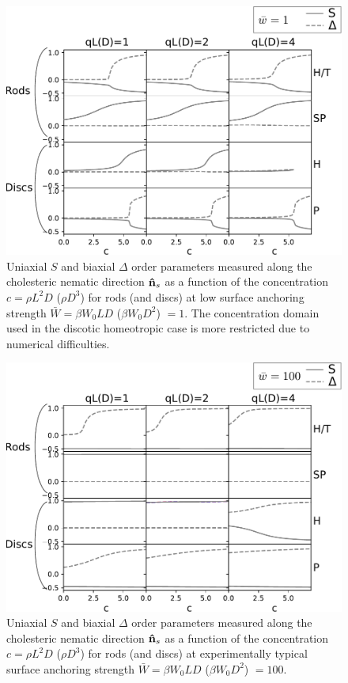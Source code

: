    \begin{figure}
	\includegraphics[width = \columnwidth]{figures/chapter-4/w1order}
	\caption{ Uniaxial $S$ and biaxial $\Delta$ order parameters measured along the cholesteric nematic direction ${\bf \hat{n}}_{s}$ as a function of the concentration $c = \rho L^{2}D$ ($\rho D^{3}$) for rods (and discs) at low surface anchoring strength $\bar{W} = \beta W_{0}LD$ ($\beta W_{0}D^2$) $= 1$. The concentration domain used in the discotic homeotropic case is more restricted due to  numerical difficulties.}
	\label{w1o}
\end{figure}

   \begin{figure}
	\includegraphics[width = \columnwidth]{figures/chapter-4/w100order}
	\caption{ Uniaxial $S$ and biaxial $\Delta$ order parameters measured along the cholesteric nematic direction ${\bf \hat{n}}_{s}$ as a function of the concentration $c = \rho L^{2}D$ ($\rho D^{3}$) for rods (and discs) at experimentally typical surface anchoring strength $\bar{W} = \beta W_{0}LD$ ($\beta W_{0}D^2$) $= 100$. }
	\label{w100o}
\end{figure}




